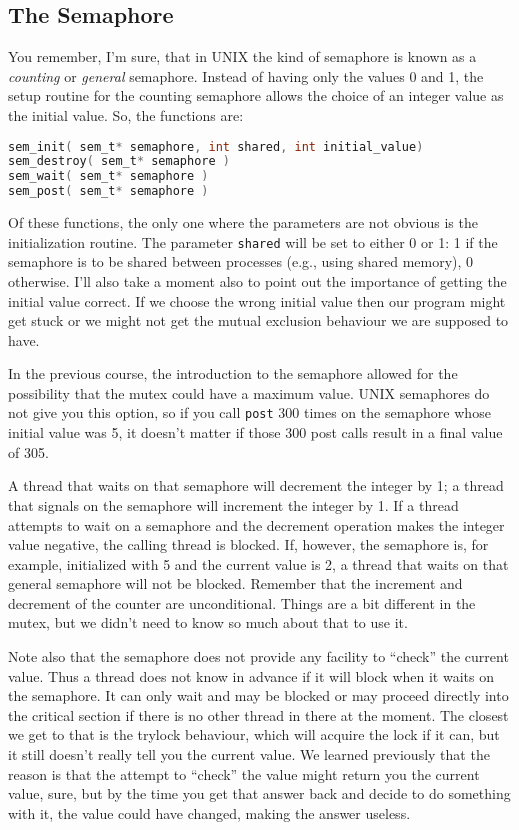 \subsection*{The Semaphore}

You remember, I'm sure, that in UNIX the kind of semaphore is known as a \textit{counting} or \textit{general} semaphore. Instead of having only the values 0 and 1, the setup routine for the counting semaphore allows the choice of an integer value as the initial value. So, the functions are:

\begin{lstlisting}[language=C]
sem_init( sem_t* semaphore, int shared, int initial_value)
sem_destroy( sem_t* semaphore )
sem_wait( sem_t* semaphore )
sem_post( sem_t* semaphore )
\end{lstlisting}

Of these functions, the only one where the parameters are not obvious is the initialization routine. The parameter \texttt{shared} will be set to either 0 or 1: 1 if the semaphore is to be shared between processes (e.g., using shared memory), 0 otherwise. I'll also take a moment also to point out the importance of getting the initial value correct. If we choose the wrong initial value then our program might get stuck or we might not get the mutual exclusion behaviour we are supposed to have.

In the previous course, the introduction to the semaphore allowed for the possibility that the mutex could have a maximum value. UNIX semaphores do not give you this option, so if you call \texttt{post} 300 times on the semaphore whose initial value was 5, it doesn't matter if those 300 post calls result in a final value of 305.

A thread that waits on that semaphore will decrement the integer by 1; a thread that signals on the semaphore will increment the integer by 1. If a thread attempts to wait on a semaphore and the decrement operation makes the integer value negative, the calling thread is blocked. If, however, the semaphore is, for example, initialized with 5 and the current value is 2, a thread that waits on that general semaphore will not be blocked. Remember that the increment and decrement of the counter are unconditional. Things are a bit different in the mutex, but we didn't need to know so much about that to use it.

Note also that the semaphore does not provide any facility to ``check'' the current value. Thus a thread does not know in advance if it will block when it waits on the semaphore. It can only wait and may be blocked or may proceed directly into the critical section if there is no other thread in there at the moment. The closest we get to that is the trylock behaviour, which will acquire the lock if it can, but it still doesn't really tell you the current value. We learned previously that the reason is that the attempt to ``check'' the value might return you the current value, sure, but by the time you get that answer back and decide to do something with it, the value could have changed, making the answer useless.

